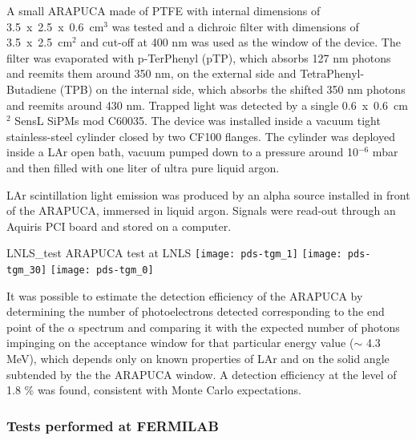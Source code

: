 A small ARAPUCA made of PTFE with internal dimensions of 3.5~x~2.5~x~0.6~cm$^3$ was tested and a dichroic filter with dimensions of 3.5~x~2.5~cm$^2$ and cut-off at 400 nm was used as the window of the device.
The filter was evaporated with p-TerPhenyl (pTP), which absorbs 127 nm photons and reemits them around 350 nm,  on the external side and TetraPhenyl-Butadiene (TPB) on the internal side, which absorbs the shifted 350 nm photons and reemits around 430 nm. Trapped light was detected by a single 0.6~x~0.6~cm$^2$  SensL SiPMs mod C60035.
The device was installed inside a vacuum tight stainless-steel cylinder closed by two CF100 flanges. The cylinder was deployed inside a LAr open bath, vacuum pumped down to a pressure around  10$^{-6}$ mbar and then filled with one liter of ultra pure liquid argon. 

LAr scintillation light emission was produced by an alpha source installed in front of the ARAPUCA, immersed in liquid argon. Signals were read-out through an Aquiris PCI board and stored on a computer.

\begin{dunefigure}{LNLS_test}
{ARAPUCA test at LNLS} 
	\texttt{[image: pds-tgm\_1]} \quad
	\texttt{[image: pds-tgm\_30]}\quad
	\texttt{[image: pds-tgm\_0]}
\end{dunefigure}

It was possible to estimate the detection efficiency of the ARAPUCA by 
determining the number of photoelectrons detected corresponding to the end point of the $\alpha$ spectrum 
and comparing it with the expected number of photons impinging on the acceptance window for that 
particular energy value ($\sim$ 4.3 MeV), which depends only on known properties of LAr and on the solid 
angle subtended by the the ARAPUCA window. A detection efficiency at the level of 1.8 \% 
was found,  consistent with Monte Carlo expectations.

\subsubsection{Tests performed at FERMILAB}
\label{subsec:test_fnal}

